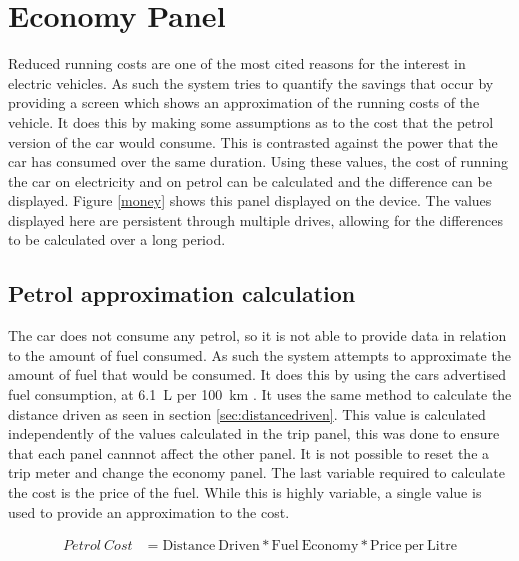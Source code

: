

\section{Economy Panel}

Reduced running costs are one of the most cited reasons for the interest in electric vehicles. As such the system tries to quantify the savings that occur by providing a screen which shows an approximation of the running costs of the vehicle. It does this by making some assumptions as to the cost that the petrol version of the car would consume. This is contrasted against the power that the car has consumed over the same duration. Using these values, the cost of running the car on electricity and on petrol can be calculated and the difference can be displayed. Figure \ref{money} shows this panel displayed on the device. The values displayed here are persistent through multiple drives, allowing for the differences to be calculated over a long period.


\subsection{Petrol approximation calculation}

The car does not consume any petrol, so it is not able to provide data in relation to the amount of fuel consumed. As such the system attempts to approximate the amount of fuel that would be consumed. It does this by using the cars advertised fuel consumption, at 6.1~L per 100~km \cite{getz_fuel_consumption}. It uses the same method to calculate the distance driven as seen in section \ref{sec:distancedriven}. This value is calculated independently of the values calculated in the trip panel, this was done to ensure that each panel cannnot affect the other panel. It is not possible to reset the a trip meter and change the economy panel. The last variable required to calculate the cost is the price of the fuel. While this is highly variable, a single value is used to provide an approximation to the cost.

\begin{align}
\label{eq:fuelcost}
Petrol\ Cost &=\mathrm{Distance\ Driven} * \mathrm{Fuel\ Economy} *\mathrm{Price\ per\ Litre}
\end{align}


